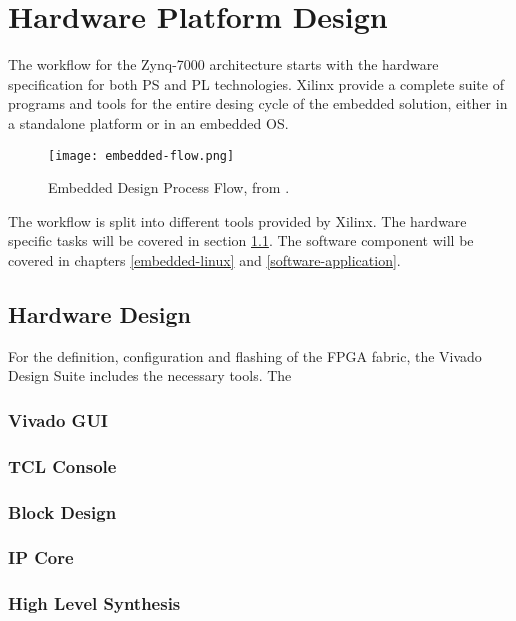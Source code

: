 

\chapter{Hardware Platform Design}

The workflow for the Zynq-7000 architecture starts with the hardware specification for both PS and PL technologies. Xilinx provide a complete suite of programs and tools for the entire desing cycle of the embedded solution, either in a standalone platform or in an embedded OS.

\begin{figure}[htp]
	\centering
	\texttt{[image: embedded-flow.png]}
	\caption{Embedded Design Process Flow, from \cite{UG1043}.} \label{fig:embedded-flow}
\end{figure}%

The workflow is split into different tools provided by Xilinx. The hardware specific tasks will be covered in section \ref{hardware-design}. The software component will be covered in chapters \ref{embedded-linux} and \ref{software-application}.

\section{Hardware Design} \label{hardware-design}

For the definition, configuration and flashing of the FPGA fabric, the Vivado Design Suite includes the necessary tools. The 

\subsection{Vivado GUI}

\subsection{TCL Console}

\subsection{Block Design}

\subsection{IP Core}

\subsection{High Level Synthesis}
